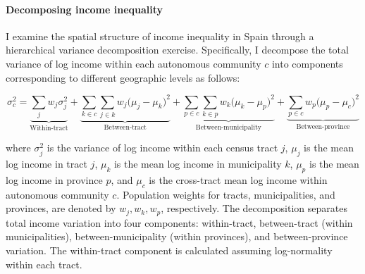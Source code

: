 
\paragraph{Decomposing income inequality} I examine the spatial structure of income inequality in Spain through a hierarchical variance decomposition exercise. Specifically, I decompose the total variance of log income within each autonomous community $c$  into components corresponding to different geographic levels as follows:

\begin{equation}\label{decomp}
\sigma^2_{c} = 
\underbrace{\sum_{j} w_j \sigma^2_{j}}_{\text{Within-tract}} + 
\underbrace{\sum_{k \in c} \sum_{j \in k} w_j \big( \mu_{j} - \mu_{k} \big)^2}_{\text{Between-tract}} + 
\underbrace{\sum_{p \in c} \sum_{k \in p} w_k \big( \mu_{k} - \mu_{p} \big)^2}_{\text{Between-municipality}} + 
\underbrace{\sum_{p \in c} w_p \big( \mu_{p} - \mu_{c} \big)^2}_{\text{Between-province}}
\end{equation}

where $\sigma^2_{j}$ is the variance of log income within each census tract $j$, $\mu_j$ is the mean log income in tract $j$, $\mu_k$ is the mean log income in municipality $k$, $\mu_p$ is the mean log income in province $p$, and  $\mu_{c}$ is the cross-tract mean log income within autonomous community $c$. Population weights for tracts, municipalities, and provinces, are denoted by $w_j, w_k, w_p$, respectively. The decomposition separates total income variation into four components: within-tract, between-tract (within municipalities), between-municipality (within provinces), and between-province variation. The within-tract component is calculated assuming log-normality within each tract.

